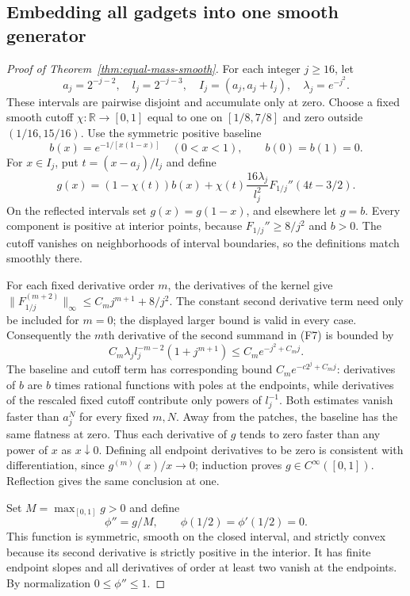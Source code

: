 \subsection{Embedding all gadgets into one smooth generator}

\begin{proof}[Proof of Theorem~\ref{thm:equal-mass-smooth}]
For each integer $j\geq16$, let
\[
 a_j=2^{-j-2},\quad l_j=2^{-j-3},\quad
 I_j=(a_j,a_j+l_j),\quad\lambda_j=e^{-j^2}.
\]
These intervals are pairwise disjoint and accumulate only at zero.
Choose a fixed smooth cutoff $\chi:\mathbb R\to[0,1]$ equal to one
on $[1/8,7/8]$ and zero outside $(1/16,15/16)$.
Use the symmetric positive baseline
\[
 b(x)=e^{-1/[x(1-x)]}\quad(0<x<1),\qquad b(0)=b(1)=0.
\]
For $x\in I_j$, put $t=(x-a_j)/l_j$ and define
\[
 g(x)=(1-\chi(t))b(x)
    +\chi(t)\frac{16\lambda_j}{l_j^2}
       F_{1/j}''(4t-3/2).
 \tag{F7}\label{eq:equal-mass-gluing}
\]
On the reflected intervals set $g(x)=g(1-x)$, and elsewhere let $g=b$.
Every component is positive at interior points, because
$F_{1/j}''\geq8/j^2$ and $b>0$.  The cutoff vanishes on neighborhoods
of interval boundaries, so the definitions match smoothly there.

For each fixed derivative order $m$, the derivatives of the kernel
give $\|F_{1/j}^{(m+2)}\|_\infty\leq C_m j^{m+1}+8/j^2$.
The constant second derivative term need only be included for $m=0$;
the displayed larger bound is valid in every case.  Consequently
the $m$th derivative of the second summand in (F7) is bounded by
\[
 C_m\lambda_j l_j^{-m-2}(1+j^{m+1})
 \leq C_m e^{-j^2+C_mj}.
 \tag{F8}\label{eq:equal-target-flatness}
\]
The baseline and cutoff term has corresponding bound
$C_me^{-c2^j+C_mj}$: derivatives of $b$ are $b$ times rational
functions with poles at the endpoints, while derivatives of the
rescaled fixed cutoff contribute only powers of $l_j^{-1}$.
Both estimates vanish faster than $a_j^N$ for every fixed $m,N$.
Away from the patches, the baseline has the same flatness at zero.
Thus each derivative of $g$ tends to zero faster than any power of
$x$ as $x\downarrow0$.  Defining all endpoint derivatives to be zero
is consistent with differentiation, since $g^{(m)}(x)/x\to0$;
induction proves $g\in C^\infty([0,1])$.  Reflection gives the same
conclusion at one.

Set $M=\max_{[0,1]}g>0$ and define
\[
 \phi''=g/M,\qquad\phi(1/2)=\phi'(1/2)=0.
\]
This function is symmetric, smooth on the closed interval, and strictly
convex because its second derivative is strictly positive in the
interior.  It has finite endpoint slopes and all derivatives of order
at least two vanish at the endpoints.  By normalization
$0\leq\phi''\leq1$.


\end{proof}
